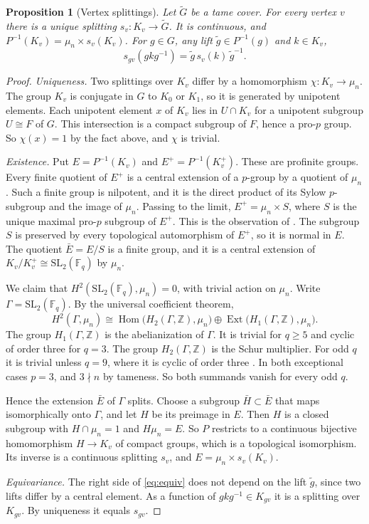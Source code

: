 \documentclass[12pt,letterpaper]{article}
\numberwithin{equation}{section}
\newtheorem{proposition}[theorem]{Proposition}
\theoremstyle{definition}
\theoremstyle{remark}
\newcommand{\kk}{\mathbb F_q}
\newcommand{\Gt}{\widetilde G}
\newcommand{\Hom}{\operatorname{Hom}}
\newcommand{\Ext}{\operatorname{Ext}}
\begin{document}
\begin{proposition}[Vertex splittings]\label{prop:splittings}
Let $\Gt$ be a tame cover. For every vertex $v$ there is a unique splitting $s_v:K_v\to\Gt$. It is continuous, and $P^{-1}(K_v)=\mu_n\times s_v(K_v)$. For $g\in G$, any lift $\widetilde g\in P^{-1}(g)$ and $k\in K_v$,
\begin{equation}\label{eq:equiv}
 s_{gv}(gkg^{-1})=\widetilde g\,s_v(k)\,\widetilde g^{-1}.
\end{equation}
\end{proposition}
\begin{proof}
\emph{Uniqueness.} Two splittings over $K_v$ differ by a homomorphism $\chi:K_v\to\mu_n$. The group $K_v$ is conjugate in $G$ to $K_0$ or $K_1$, so it is generated by unipotent elements. Each unipotent element $x$ of $K_v$ lies in $U\cap K_v$ for a unipotent subgroup $U\cong F$ of $G$. This intersection is a compact subgroup of $F$, hence a pro-$p$ group. So $\chi(x)=1$ by the fact above, and $\chi$ is trivial.

\emph{Existence.} Put $E=P^{-1}(K_v)$ and $E^+=P^{-1}(K_v^+)$. These are profinite groups. Every finite quotient of $E^+$ is a central extension of a $p$-group by a quotient of $\mu_n$. Such a finite group is nilpotent, and it is the direct product of its Sylow $p$-subgroup and the image of $\mu_n$. Passing to the limit, $E^+=\mu_n\times S$, where $S$ is the unique maximal pro-$p$ subgroup of $E^+$. This is the observation of \cite[Prop.~2.3]{HW09}. The subgroup $S$ is preserved by every topological automorphism of $E^+$, so it is normal in $E$. The quotient $\bar E=E/S$ is a finite group, and it is a central extension of $K_v/K_v^+\cong\mathrm{SL}_2(\kk)$ by $\mu_n$.

We claim that $H^2(\mathrm{SL}_2(\kk),\mu_n)=0$, with trivial action on $\mu_n$. Write $\Gamma=\mathrm{SL}_2(\kk)$. By the universal coefficient theorem,
\[
 H^2(\Gamma,\mu_n)\cong\Hom\bigl(H_2(\Gamma,\mathbb Z),\mu_n\bigr)\oplus\Ext\bigl(H_1(\Gamma,\mathbb Z),\mu_n\bigr).
\]
The group $H_1(\Gamma,\mathbb Z)$ is the abelianization of $\Gamma$. It is trivial for $q\ge5$ and cyclic of order three for $q=3$. The group $H_2(\Gamma,\mathbb Z)$ is the Schur multiplier. For odd $q$ it is trivial unless $q=9$, where it is cyclic of order three \cite{Sc07,St81}. In both exceptional cases $p=3$, and $3\nmid n$ by tameness. So both summands vanish for every odd $q$.

Hence the extension $\bar E$ of $\Gamma$ splits. Choose a subgroup $\bar H\subset\bar E$ that maps isomorphically onto $\Gamma$, and let $H$ be its preimage in $E$. Then $H$ is a closed subgroup with $H\cap\mu_n=1$ and $H\mu_n=E$. So $P$ restricts to a continuous bijective homomorphism $H\to K_v$ of compact groups, which is a topological isomorphism. Its inverse is a continuous splitting $s_v$, and $E=\mu_n\times s_v(K_v)$.

\emph{Equivariance.} The right side of \eqref{eq:equiv} does not depend on the lift $\widetilde g$, since two lifts differ by a central element. As a function of $gkg^{-1}\in K_{gv}$ it is a splitting over $K_{gv}$. By uniqueness it equals $s_{gv}$.
\end{proof}
\end{document}

